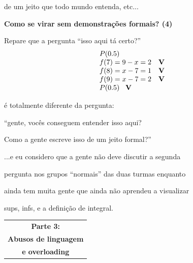 \documentclass[oneside,12pt]{article}
\begin{document}
de um jeito que todo mundo entenda, etc...

\newpage


{\bf Como se virar sem demonstrações formais? (4)}

Repare que a pergunta ``isso aqui tá certo?''
%
$$\begin{array}{ll}
  P(0.5) \\
  f(7) = 9-x = 2 & \mathbf{V} \\ 
  f(8) = x-7 = 1 & \mathbf{V} \\ 
  f(9) = x-7 = 2 & \mathbf{V} \\ 
  P(0.5) \;\;\; \mathbf{V} \\
  \end{array}
$$

é totalmente diferente da pergunta:

\ssk

``gente, vocês conseguem entender isso aqui?

Como a gente escreve isso de um jeito formal?''

\msk

...e eu considero que a gente não deve discutir a segunda

pergunta nos grupos ``normais'' das duas turmas enquanto

ainda tem muita gente que ainda não aprendeu a visualizar

sups, infs, e a definição de integral.

\newpage


\thispagestyle{empty}

\begin{center}

\vspace*{1.2cm}

\begin{tabular}{c}
{\bf \large Parte 3:} \\
{\bf \Large Abusos de linguagem} \\
{\bf \Large e overloading} \\
\end{tabular}

\end{center}
\end{document}
